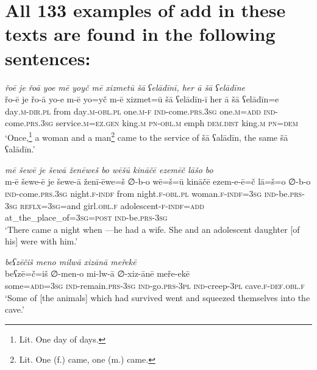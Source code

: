 \chapter{All 133 examples of add in these texts are found in the following sentences:}

\ea \label{ZB.1}
\textit{řoē je řoā yoe mē yoyč mē xizmetū šā ʕelādīnī, her ā šā ʕelādīne} \\ 
\gll řo-ē je řo-ā yo-e m-ē yo=yč m-ē xizmet=ū šā ʕelādīn-ī her ā šā ʕelādīn=e \\ 
 day\textsc{.m}\textsc{-dir}\textsc{.pl} from day\textsc{.m}\textsc{-obl}\textsc{.pl} one\textsc{.m}\textsc{-f} \textsc{ind-}come\textsc{.prs}\textsc{.3sg} one\textsc{.m}\textsc{=add} \textsc{ind-}come\textsc{.prs}\textsc{.3sg} service\textsc{.m}\textsc{\textsc{=ez.gen}} king\textsc{.m} \textsc{pn}\textsc{-obl}\textsc{.m} emph \textsc{dem.dist} king\textsc{.m} \textsc{pn}\textsc{=dem} \\ 
\glt `Once,\footnote{Lit. One day of days.} a woman and a man\footnote{Lit. One (f.) came, one (m.) came.} came to the service of šā ʕalādīn, the same šā ʕalādīn.'
\z 
 
\ea \label{ZB.8}
\textit{mē šewē je šewā ženēweš bo wēšū kināčē ezemēč lāšo bo} \\ 
\gll m-ē šewe-ē je šewe-ā ženī-ēwe=š ∅-b-o wē=š=ū kināčē ezem-e-ē=č lā=š=o ∅-b-o \\ 
 \textsc{ind-}come\textsc{.prs}\textsc{.3sg} night\textsc{.f}\textsc{-indf} from night\textsc{.f}\textsc{-obl}\textsc{.pl} woman\textsc{.f}\textsc{-indf}\textsc{=3sg} \textsc{ind-}be\textsc{.prs}\textsc{-3sg} \textsc{reflx}\textsc{=3sg}=and girl\textsc{.obl}\textsc{.f} adolescent\textsc{-f}\textsc{-indf}\textsc{=add} at\_the\_place\_of\textsc{=3sg}\textsc{=\textsc{post}} \textsc{ind-}be\textsc{.prs}\textsc{-3sg} \\ 
\glt `There came a night when —he had a wife. She and an adolescent daughter [of his] were with him.'
\z 
 
\ea \label{ZB.23}
\textit{beʕzēčiš meno milwā xizānā meřekē} \\ 
\gll beʕzē=č=iš ∅-men-o mi-lw-ā ∅-xiz-ānē meře-ekē \\ 
 some\textsc{=add}\textsc{=3sg} \textsc{ind-}remain\textsc{.prs}\textsc{-3sg} \textsc{ind-}go\textsc{.prs}\textsc{-3pl} \textsc{ind-}creep\textsc{-3pl} cave\textsc{.f}\textsc{-def}\textsc{.obl}\textsc{.f} \\ 
\glt `Some of [the animals] which had survived went and squeezed themselves into the cave.'
\z 
 
